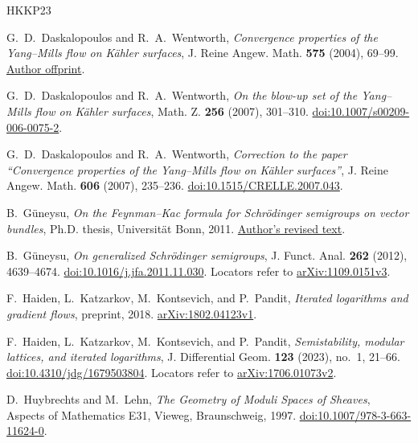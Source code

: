 \begin{thebibliography}{HKKP23}

G.~D.~Daskalopoulos and R.~A.~Wentworth,
\emph{Convergence properties of the Yang--Mills flow on K\"ahler surfaces},
J. Reine Angew. Math. \textbf{575} (2004), 69--99.
\href{https://www.math.umd.edu/~raw/papers/YM_flow.pdf}{Author offprint}.

G.~D.~Daskalopoulos and R.~A.~Wentworth,
\emph{On the blow-up set of the Yang--Mills flow on K\"ahler surfaces},
Math. Z. \textbf{256} (2007), 301--310.
\href{https://doi.org/10.1007/s00209-006-0075-2}{doi:10.1007/s00209-006-0075-2}.

G.~D.~Daskalopoulos and R.~A.~Wentworth,
\emph{Correction to the paper ``Convergence properties of the Yang--Mills flow on K\"ahler surfaces''},
J. Reine Angew. Math. \textbf{606} (2007), 235--236.
\href{https://doi.org/10.1515/CRELLE.2007.043}{doi:10.1515/CRELLE.2007.043}.

B.~G\"uneysu,
\emph{On the Feynman--Kac formula for Schr\"odinger semigroups on vector bundles},
Ph.D. thesis, Universit\"at Bonn, 2011.
\href{https://www.tu-chemnitz.de/mathematik/gueneysu/GueDiss.pdf}{Author's revised text}.

B.~G\"uneysu, \emph{On generalized Schr\"odinger semigroups},
J. Funct. Anal. \textbf{262} (2012), 4639--4674.
\href{https://doi.org/10.1016/j.jfa.2011.11.030}{doi:10.1016/j.jfa.2011.11.030}.
Locators refer to \href{https://arxiv.org/abs/1109.0151v3}{arXiv:1109.0151v3}.

F.~Haiden, L.~Katzarkov, M.~Kontsevich, and P.~Pandit,
\emph{Iterated logarithms and gradient flows}, preprint, 2018.
\href{https://arxiv.org/abs/1802.04123v1}{arXiv:1802.04123v1}.

F.~Haiden, L.~Katzarkov, M.~Kontsevich, and P.~Pandit,
\emph{Semistability, modular lattices, and iterated logarithms},
J. Differential Geom. \textbf{123} (2023), no.~1, 21--66.
\href{https://doi.org/10.4310/jdg/1679503804}{doi:10.4310/jdg/1679503804}.
Locators refer to \href{https://arxiv.org/abs/1706.01073v2}{arXiv:1706.01073v2}.

D.~Huybrechts and M.~Lehn, \emph{The Geometry of Moduli Spaces of Sheaves},
Aspects of Mathematics E31, Vieweg, Braunschweig, 1997.
\href{https://doi.org/10.1007/978-3-663-11624-0}{doi:10.1007/978-3-663-11624-0}.


\end{thebibliography}
